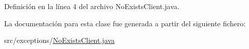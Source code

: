 Definición en la línea 4 del archivo No\+Exists\+Client.\+java.


\begin{DoxyCode}{0}

\end{DoxyCode}


La documentación para esta clase fue generada a partir del siguiente fichero\+:\begin{DoxyCompactItemize}
\item 
src/exceptions/\mbox{\hyperlink{_no_exists_client_8java}{No\+Exists\+Client.\+java}}\end{DoxyCompactItemize}
